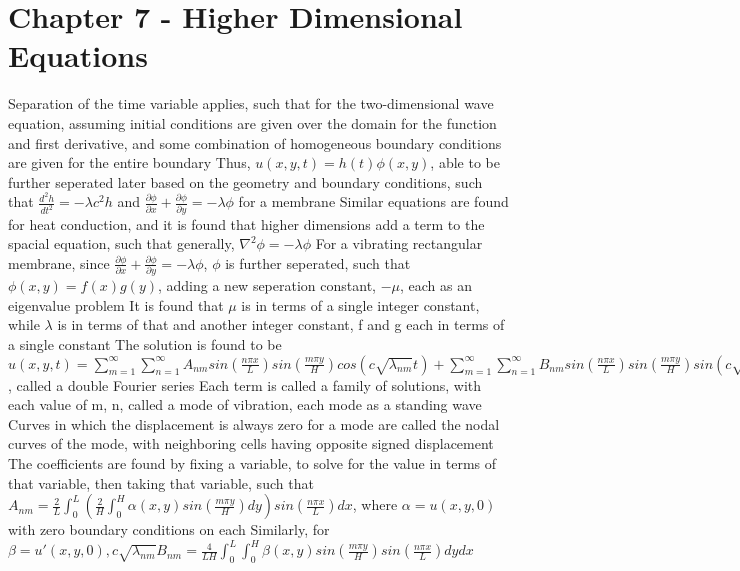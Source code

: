 \documentclass[11 pt, twoside]{article}
\newenvironment{outline*}
{
	\begin{outline}[enumerate]
	}
	{\end{outline}
}
\newcommand\pd[2]{\frac{\partial #1}{\partial #2}}
\begin{document}
\section{Chapter 7 - Higher Dimensional Equations}
\begin{outline*}
\1 Separation of the time variable applies, such that for the two-dimensional wave equation, assuming initial conditions are given over the domain for the function and first derivative, and some combination of homogeneous boundary conditions are given for the entire boundary
	\2 Thus, $u(x, y, t) = h(t)\phi(x, y)$, able to be further seperated later based on the geometry and boundary conditions, such that $\frac{d^2h}{dt^2} = -\lambda c^2h$ and $\pd{\phi}{x} + \pd{\phi}{y} = -\lambda \phi$ for a membrane
	\2 Similar equations are found for heat conduction, and it is found that higher dimensions add a term to the spacial equation, such that generally, $\nabla^2 \phi = -\lambda \phi$
\1 For a vibrating rectangular membrane, since $\pd{\phi}{x} + \pd{\phi}{y} = -\lambda \phi$, $\phi$ is further seperated, such that $\phi(x, y) = f(x)g(y)$, adding a new seperation constant, $-\mu$, each as an eigenvalue problem
	\2 It is found that $\mu$ is in terms of a single integer constant, while $\lambda$ is in terms of that and another integer constant, f and g each in terms of a single constant
	\2 The solution is found to be $u(x, y, t) = \sum_{m = 1}^{\infty} \sum_{n = 1}^{\infty} A_{nm} sin(\frac{n\pi x}{L}) sin(\frac{m\pi y}{H}) cos(c\sqrt{\lambda_{nm}}t) + \sum_{m = 1}^{\infty} \sum_{n = 1}^{\infty} B_{nm} sin(\frac{n\pi x}{L}) sin(\frac{m\pi y}{H}) sin(c\sqrt{\lambda_{nm}}t)$, called a double Fourier series
		\3 Each term is called a family of solutions, with each value of m, n, called a mode of vibration, each mode as a standing wave
		\3 Curves in which the displacement is always zero for a mode are called the nodal curves of the mode, with neighboring cells having opposite signed displacement
	\2 The coefficients are found by fixing a variable, to solve for the value in terms of that variable, then taking that variable, such that $A_{nm} = \frac{2}{L}\int^L_0 (\frac{2}{H}\int^H_0 \alpha(x, y) sin(\frac{m\pi y}{H})dy) sin(\frac{n\pi x}{L})dx$, where $\alpha = u(x, y, 0)$ with zero boundary conditions on each
		\3 Similarly, for $\beta = u'(x, y, 0), c\sqrt{\lambda_{nm}}B_{nm} = \frac{4}{LH}\int^L_0 \int_0^H \beta(x, y) sin(\frac{m\pi y}{H}) sin(\frac{n\pi x}{L})dydx$
\1 
\end{outline*}
\end{document}
